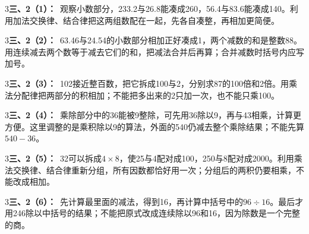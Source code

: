 \documentclass[multi=snippet,border={5bp 20bp 5bp 5bp}]{standalone}
\newenvironment{snippet}[3]{\begin{minipage}{#1bp}\color{answerred}\fontsize{#2}{#3}\selectfont\raggedright}{\end{minipage}}
\begin{document}
\begin{snippet}{505}{11.5}{14}\begin{multicols}{3}\raggedcolumns \textbf{三、2（1）：}\ 观察小数部分，233.2与26.8能凑成260，56.4与83.6能凑成140。利用加法交换律、结合律把这两组数配在一起，先各自凑整，再相加更简便。\end{multicols}\end{snippet}
\begin{snippet}{505}{11.5}{14}\begin{multicols}{3}\raggedcolumns \textbf{三、2（2）：}\ 63.46与24.54的小数部分相加正好凑成1，两个减数的和是整数88。用连续减去两个数等于减去它们的和，把减法合并后再算；合并减数时括号内应写加号。\end{multicols}\end{snippet}
\begin{snippet}{505}{11.5}{14}\begin{multicols}{3}\raggedcolumns \textbf{三、2（3）：}\ 102接近整百数，把它拆成100与2，分别求87的100倍和2倍。用乘法分配律把两部分的积相加；不能把多出来的2只加一次，也不能只乘100。\end{multicols}\end{snippet}
\begin{snippet}{505}{11.5}{14}\begin{multicols}{3}\raggedcolumns \textbf{三、2（4）：}\ 乘除部分中的36能被9整除，可先用36除以9，再与43相乘，计算更方便。这里调整的是乘积除以9的算法，外面的540仍减去整个乘除结果；不能先算\(540-36\)\allowbreak 。\end{multicols}\end{snippet}
\begin{snippet}{505}{11.5}{14}\begin{multicols}{3}\raggedcolumns \textbf{三、2（5）：}\ 32可以拆成\(4\times8\)\allowbreak ，使25与4配对成100，250与8配对成2000。利用乘法交换律、结合律重新分组，所有因数都恰好用一次；分组后的两积仍要相乘，不能改成相加。\end{multicols}\end{snippet}
\begin{snippet}{505}{11.5}{14}\begin{multicols}{3}\raggedcolumns \textbf{三、2（6）：}\ 先计算最里面的减法，得到16，再计算中括号中的\(96\div16\)\allowbreak 。最后才用246除以中括号的结果；不能把原式改成连续除以96和16，因为除数是一个完整的商。\end{multicols}\end{snippet}
\end{document}

